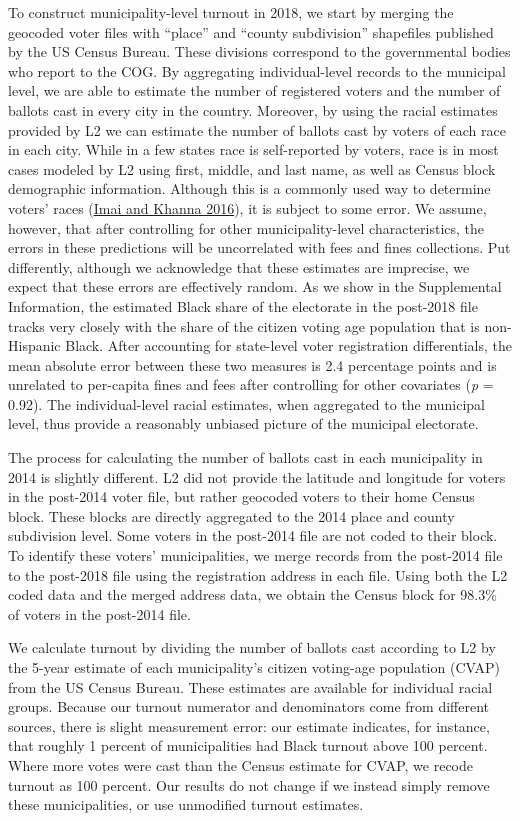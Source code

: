 \documentclass[
  12pt,
]{article}
\begin{document}
To construct municipality-level turnout in 2018, we start by merging the geocoded voter files with ``place'' and ``county subdivision'' shapefiles published by the US Census Bureau. These divisions correspond to the governmental bodies who report to the COG. By aggregating individual-level records to the municipal level, we are able to estimate the number of registered voters and the number of ballots cast in every city in the country. Moreover, by using the racial estimates provided by L2 we can estimate the number of ballots cast by voters of each race in each city. While in a few states race is self-reported by voters, race is in most cases modeled by L2 using first, middle, and last name, as well as Census block demographic information. Although this is a commonly used way to determine voters' races (\protect\hyperlink{ref-Imai2016}{Imai and Khanna 2016}), it is subject to some error. We assume, however, that after controlling for other municipality-level characteristics, the errors in these predictions will be uncorrelated with fees and fines collections. Put differently, although we acknowledge that these estimates are imprecise, we expect that these errors are effectively random. As we show in the Supplemental Information, the estimated Black share of the electorate in the post-2018 file tracks very closely with the share of the citizen voting age population that is non-Hispanic Black. After accounting for state-level voter registration differentials, the mean absolute error between these two measures is 2.4 percentage points and is unrelated to per-capita fines and fees after controlling for other covariates (\emph{p} = 0.92). The individual-level racial estimates, when aggregated to the municipal level, thus provide a reasonably unbiased picture of the municipal electorate.

The process for calculating the number of ballots cast in each municipality in 2014 is slightly different. L2 did not provide the latitude and longitude for voters in the post-2014 voter file, but rather geocoded voters to their home Census block. These blocks are directly aggregated to the 2014 place and county subdivision level. Some voters in the post-2014 file are not coded to their block. To identify these voters' municipalities, we merge records from the post-2014 file to the post-2018 file using the registration address in each file. Using both the L2 coded data and the merged address data, we obtain the Census block for 98.3\% of voters in the post-2014 file.

We calculate turnout by dividing the number of ballots cast according to L2 by the 5-year estimate of each municipality's citizen voting-age population (CVAP) from the US Census Bureau. These estimates are available for individual racial groups. Because our turnout numerator and denominators come from different sources, there is slight measurement error: our estimate indicates, for instance, that roughly 1 percent of municipalities had Black turnout above 100 percent. Where more votes were cast than the Census estimate for CVAP, we recode turnout as 100 percent. Our results do not change if we instead simply remove these municipalities, or use unmodified turnout estimates.
\end{document}
